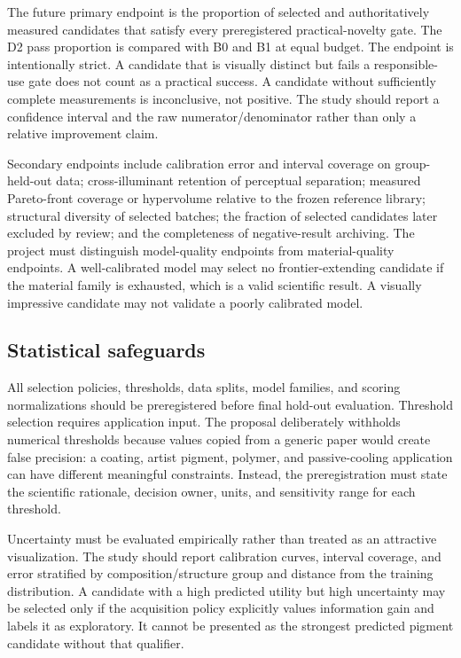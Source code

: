 \documentclass[conference]{IEEEtran}
\begin{document}
The future primary endpoint is the proportion of selected and authoritatively measured candidates that satisfy every preregistered practical-novelty gate. The D2 pass proportion is compared with B0 and B1 at equal budget. The endpoint is intentionally strict. A candidate that is visually distinct but fails a responsible-use gate does not count as a practical success. A candidate without sufficiently complete measurements is inconclusive, not positive. The study should report a confidence interval and the raw numerator/denominator rather than only a relative improvement claim.

Secondary endpoints include calibration error and interval coverage on group-held-out data; cross-illuminant retention of perceptual separation; measured Pareto-front coverage or hypervolume relative to the frozen reference library; structural diversity of selected batches; the fraction of selected candidates later excluded by review; and the completeness of negative-result archiving. The project must distinguish model-quality endpoints from material-quality endpoints. A well-calibrated model may select no frontier-extending candidate if the material family is exhausted, which is a valid scientific result. A visually impressive candidate may not validate a poorly calibrated model.

\subsection{Statistical safeguards}

All selection policies, thresholds, data splits, model families, and scoring normalizations should be preregistered before final hold-out evaluation. Threshold selection requires application input. The proposal deliberately withholds numerical thresholds because values copied from a generic paper would create false precision: a coating, artist pigment, polymer, and passive-cooling application can have different meaningful constraints. Instead, the preregistration must state the scientific rationale, decision owner, units, and sensitivity range for each threshold.

Uncertainty must be evaluated empirically rather than treated as an attractive visualization. The study should report calibration curves, interval coverage, and error stratified by composition/structure group and distance from the training distribution. A candidate with a high predicted utility but high uncertainty may be selected only if the acquisition policy explicitly values information gain and labels it as exploratory. It cannot be presented as the strongest predicted pigment candidate without that qualifier.
\end{document}

